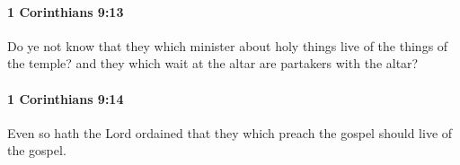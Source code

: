 		\paragraph{1 Corinthians 9:13} %
			\label{1CORINTHIANS-9-13}

			Do ye not know that they which minister about holy things live of the things of the temple?  and they which wait at the altar are partakers with the altar?

			\begin{framed}
			\scriptsize
				\begin{compactdesc}
					\item[SBLG] 
				\end{compactdesc}
			\end{framed}

		\paragraph{1 Corinthians 9:14} %
			\label{1CORINTHIANS-9-14}

			Even so hath the Lord ordained that they which preach the gospel should live of the gospel.

